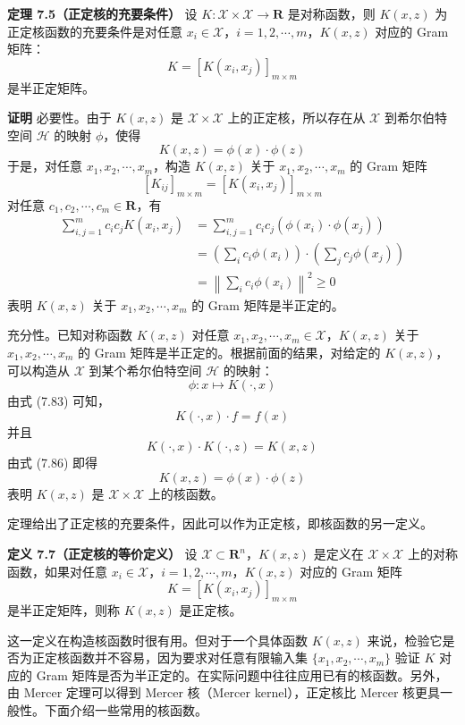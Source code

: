 \documentclass[UTF8,12pt,a4paper,fontset=fandol]{ctexart}
\begin{document}
\noindent\textbf{定理 7.5（正定核的充要条件）}\quad
设 $K:\mathcal{X}\times\mathcal{X}\to\mathbf{R}$ 是对称函数，则 $K(x,z)$ 为正定核函数的充要条件是对任意 $x_i\in\mathcal{X}$，$i=1,2,\cdots,m$，$K(x,z)$ 对应的 Gram 矩阵：
\begin{equation}
K=[K(x_i,x_j)]_{m\times m}
\tag{7.85}
\end{equation}
是半正定矩阵。

\noindent\textbf{证明}\quad
必要性。由于 $K(x,z)$ 是 $\mathcal{X}\times\mathcal{X}$ 上的正定核，所以存在从 $\mathcal{X}$ 到希尔伯特空间 $\mathcal{H}$ 的映射 $\phi$，使得
\[
K(x,z)=\phi(x)\cdot\phi(z)
\]
于是，对任意 $x_1,x_2,\cdots,x_m$，构造 $K(x,z)$ 关于 $x_1,x_2,\cdots,x_m$ 的 Gram 矩阵
\[
[K_{ij}]_{m\times m}=[K(x_i,x_j)]_{m\times m}
\]
对任意 $c_1,c_2,\cdots,c_m\in\mathbf{R}$，有
\[
\begin{aligned}
\sum_{i,j=1}^m c_i c_j K(x_i,x_j)
&=\sum_{i,j=1}^m c_i c_j(\phi(x_i)\cdot\phi(x_j))\\
&=\left(\sum_i c_i\phi(x_i)\right)\cdot\left(\sum_j c_j\phi(x_j)\right)\\
&=\left\|\sum_i c_i\phi(x_i)\right\|^2\geq 0
\end{aligned}
\]
表明 $K(x,z)$ 关于 $x_1,x_2,\cdots,x_m$ 的 Gram 矩阵是半正定的。

充分性。已知对称函数 $K(x,z)$ 对任意 $x_1,x_2,\cdots,x_m\in\mathcal{X}$，$K(x,z)$ 关于 $x_1,x_2,\cdots,x_m$ 的 Gram 矩阵是半正定的。根据前面的结果，对给定的 $K(x,z)$，可以构造从 $\mathcal{X}$ 到某个希尔伯特空间 $\mathcal{H}$ 的映射：
\begin{equation}
\phi:x\mapsto K(\cdot,x)
\tag{7.86}
\end{equation}
由式 (7.83) 可知，
\[
K(\cdot,x)\cdot f=f(x)
\]
并且
\[
K(\cdot,x)\cdot K(\cdot,z)=K(x,z)
\]
由式 (7.86) 即得
\[
K(x,z)=\phi(x)\cdot\phi(z)
\]
表明 $K(x,z)$ 是 $\mathcal{X}\times\mathcal{X}$ 上的核函数。

定理给出了正定核的充要条件，因此可以作为正定核，即核函数的另一定义。

\noindent\textbf{定义 7.7（正定核的等价定义）}\quad
设 $\mathcal{X}\subset\mathbf{R}^n$，$K(x,z)$ 是定义在 $\mathcal{X}\times\mathcal{X}$ 上的对称函数，如果对任意 $x_i\in\mathcal{X}$，$i=1,2,\cdots,m$，$K(x,z)$ 对应的 Gram 矩阵
\begin{equation}
K=[K(x_i,x_j)]_{m\times m}
\tag{7.87}
\end{equation}
是半正定矩阵，则称 $K(x,z)$ 是正定核。

这一定义在构造核函数时很有用。但对于一个具体函数 $K(x,z)$ 来说，检验它是否为正定核函数并不容易，因为要求对任意有限输入集 $\{x_1,x_2,\cdots,x_m\}$ 验证 $K$ 对应的 Gram 矩阵是否为半正定的。在实际问题中往往应用已有的核函数。另外，由 Mercer 定理可以得到 Mercer 核（Mercer kernel），正定核比 Mercer 核更具一般性。下面介绍一些常用的核函数。
\end{document}
